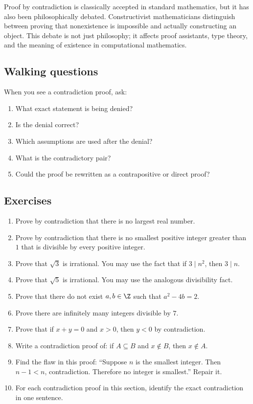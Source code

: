 \begin{historybox}
Proof by contradiction is classically accepted in standard mathematics, but it has also been philosophically debated. Constructivist mathematicians distinguish between proving that nonexistence is impossible and actually constructing an object. This debate is not just philosophy; it affects proof assistants, type theory, and the meaning of existence in computational mathematics.
\end{historybox}

\subsection{Walking questions}

\begin{walkbox}
When you see a contradiction proof, ask:

\begin{enumerate}
\item What exact statement is being denied?
\item Is the denial correct?
\item Which assumptions are used after the denial?
\item What is the contradictory pair?
\item Could the proof be rewritten as a contrapositive or direct proof?
\end{enumerate}
\end{walkbox}

\subsection{Exercises}

\begin{enumerate}
\item Prove by contradiction that there is no largest real number.
\item Prove by contradiction that there is no smallest positive integer greater than $1$ that is divisible by every positive integer.
\item Prove that $\sqrt3$ is irrational. You may use the fact that if $3\mid n^2$, then $3\mid n$.
\item Prove that $\sqrt5$ is irrational. You may use the analogous divisibility fact.
\item Prove that there do not exist $a,b\in\Z$ such that $a^2-4b=2$.
\item Prove there are infinitely many integers divisible by $7$.
\item Prove that if $x+y=0$ and $x>0$, then $y<0$ by contradiction.
\item Write a contradiction proof of: if $A\subseteq B$ and $x\notin B$, then $x\notin A$.
\item Find the flaw in this proof: ``Suppose $n$ is the smallest integer. Then $n-1<n$, contradiction. Therefore no integer is smallest.'' Repair it.
\item For each contradiction proof in this section, identify the exact contradiction in one sentence.
\end{enumerate}

